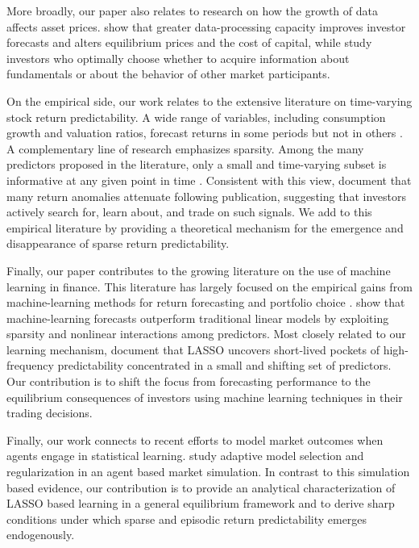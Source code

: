 \documentclass[11pt]{article}
\begin{document}
More broadly, our paper also relates to research on how the growth of data affects asset prices. 
\citet{begenau2018big} show that greater data-processing capacity improves investor forecasts and alters equilibrium prices and the cost of capital, while \citet{farboodi2020long} study investors who optimally choose whether to acquire information about fundamentals or about the behavior of other market participants.

On the empirical side, our work relates to the extensive literature on time-varying stock return predictability. 
A wide range of variables, including consumption growth and valuation ratios, forecast returns in some periods but not in others \citep{AngBekaert2007RFS,GoyalWelch2003MS,LettauLudvigson2001JF}. 
A complementary line of research emphasizes sparsity.
Among the many predictors proposed in the literature, only a small and time-varying subset is informative at any given point in time \citep{kozak2020shrinking,freyberger2020dissecting}. 
Consistent with this view, \citet{Mclean2016} document that many return anomalies attenuate following publication, suggesting that investors actively search for, learn about, and trade on such signals.
We add to this empirical literature by providing a theoretical mechanism for the emergence and disappearance  of sparse return predictability.

Finally, our paper contributes to the growing literature on the use of machine learning in finance. 
This literature has largely focused on the empirical gains from machine-learning methods for return forecasting and portfolio choice \citep{Feng2020}. 
\citet{Gu2020} show that machine-learning forecasts outperform traditional linear models by exploiting sparsity and nonlinear interactions among predictors. 
Most closely related to our learning mechanism, \citet{Chinco2019} document that LASSO uncovers short-lived pockets of high-frequency predictability concentrated in a small and shifting set of predictors. 
Our contribution is to shift the focus from forecasting performance to the equilibrium consequences of investors using machine learning techniques in their trading decisions.

Finally, our work connects to recent efforts to model market outcomes when agents engage in statistical learning.
\citet{Georges2021} study adaptive model selection and regularization in an agent based market simulation.
In contrast to this simulation based evidence, our contribution is to provide an analytical characterization of LASSO based learning in a general equilibrium framework and to derive sharp conditions under which sparse and episodic return predictability emerges endogenously.
\end{document}
